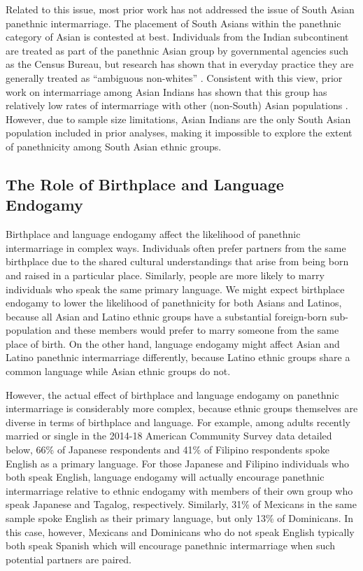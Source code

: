 \documentclass[11pt,]{article}
\begin{document}
Related to this issue, most prior work has not addressed the issue of South Asian panethnic intermarriage. The placement of South Asians within the panethnic category of Asian is contested at best. Individuals from the Indian subcontinent are treated as part of the panethnic Asian group by governmental agencies such as the Census Bureau, but research has shown that in everyday practice they are generally treated as ``ambiguous non-whites'' \citep{kibria_not_1996, morning_racial_2001, schachter_finding_2014}. Consistent with this view, prior work on intermarriage among Asian Indians has shown that this group has relatively low rates of intermarriage with other (non-South) Asian populations \citep{qian_asian_2001, lichter_whom_2015a}. However, due to sample size limitations, Asian Indians are the only South Asian population included in prior analyses, making it impossible to explore the extent of panethnicity among South Asian ethnic groups.

\hypertarget{the-role-of-birthplace-and-language-endogamy}{%
\subsection{The Role of Birthplace and Language Endogamy}\label{the-role-of-birthplace-and-language-endogamy}}

Birthplace and language endogamy affect the likelihood of panethnic intermarriage in complex ways. Individuals often prefer partners from the same birthplace due to the shared cultural understandings that arise from being born and raised in a particular place. Similarly, people are more likely to marry individuals who speak the same primary language. We might expect birthplace endogamy to lower the likelihood of panethnicity for both Asians and Latinos, because all Asian and Latino ethnic groups have a substantial foreign-born sub-population and these members would prefer to marry someone from the same place of birth. On the other hand, language endogamy might affect Asian and Latino panethnic intermarriage differently, because Latino ethnic groups share a common language while Asian ethnic groups do not.

However, the actual effect of birthplace and language endogamy on panethnic intermarriage is considerably more complex, because ethnic groups themselves are diverse in terms of birthplace and language. For example, among adults recently married or single in the 2014-18 American Community Survey data detailed below, 66\% of Japanese respondents and 41\% of Filipino respondents spoke English as a primary language. For those Japanese and Filipino individuals who both speak English, language endogamy will actually encourage panethnic intermarriage relative to ethnic endogamy with members of their own group who speak Japanese and Tagalog, respectively. Similarly, 31\% of Mexicans in the same sample spoke English as their primary language, but only 13\% of Dominicans. In this case, however, Mexicans and Dominicans who do not speak English typically both speak Spanish which will encourage panethnic intermarriage when such potential partners are paired.
\end{document}
